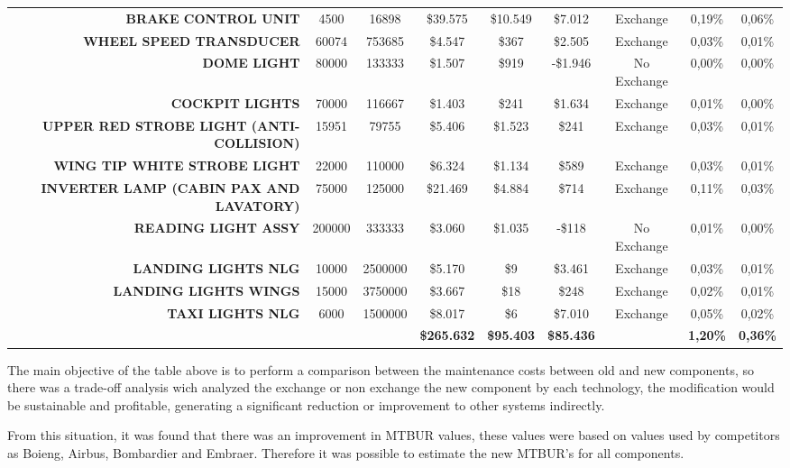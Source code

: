 \begin{table}[htbp]
\begin{tabular}{rcccccccc}
    \textbf{BRAKE CONTROL UNIT} & 4500  & 16898 & \$39.575 & \$10.549 & \$7.012 & Exchange & 0,19\% & 0,06\% \\
    \textbf{WHEEL SPEED TRANSDUCER } & 60074 & 753685 & \$4.547 & \$367 & \$2.505 & Exchange & 0,03\% & 0,01\% \\
    \textbf{DOME LIGHT} & 80000 & 133333 & \$1.507 & \$919 & -\$1.946 & No Exchange & 0,00\% & 0,00\% \\
    \textbf{COCKPIT LIGHTS} & 70000 & 116667 & \$1.403 & \$241 & \$1.634 & Exchange & 0,01\% & 0,00\% \\
    \textbf{UPPER RED STROBE LIGHT (ANTI-COLLISION)} & 15951 & 79755 & \$5.406 & \$1.523 & \$241 & Exchange & 0,03\% & 0,01\% \\
    \textbf{WING TIP WHITE STROBE LIGHT} & 22000 & 110000 & \$6.324 & \$1.134 & \$589 & Exchange & 0,03\% & 0,01\% \\
    \textbf{INVERTER LAMP (CABIN PAX AND LAVATORY)} & 75000 & 125000 & \$21.469 & \$4.884 & \$714 & Exchange & 0,11\% & 0,03\% \\
    \textbf{READING LIGHT ASSY} & 200000 & 333333 & \$3.060 & \$1.035 & -\$118 & No Exchange & 0,01\% & 0,00\% \\
    \textbf{LANDING LIGHTS NLG} & 10000 & 2500000 & \$5.170 & \$9   & \$3.461 & Exchange & 0,03\% & 0,01\% \\
    \textbf{LANDING LIGHTS WINGS} & 15000 & 3750000 & \$3.667 & \$18  & \$248 & Exchange & 0,02\% & 0,01\% \\
    \textbf{TAXI LIGHTS NLG} & 6000  & 1500000 & \$8.017 & \$6   & \$7.010 & Exchange & 0,05\% & 0,02\% \\
    \multicolumn{1}{c}{\textbf{}} & \textbf{} & \textbf{} & \textbf{\$265.632} & \textbf{\$95.403} & \textbf{\$85.436} & \textbf{} & \textbf{1,20\%} & \textbf{0,36\%} \\
    \bottomrule
    \end{tabular}%
  \label{tab:componentsMTBUR}%
\end{table}%

The main objective of the table above is to perform a comparison between the maintenance costs between old and new components, so there was a trade-off analysis wich analyzed the exchange or non exchange the new component by each technology, the modification would be sustainable and profitable, generating a significant reduction or improvement to other systems indirectly.

From this situation, it was found that there was an improvement in MTBUR values, these values were based on values used by competitors as Boieng, Airbus, Bombardier and Embraer. Therefore it was possible to estimate the new MTBUR's for all components.

